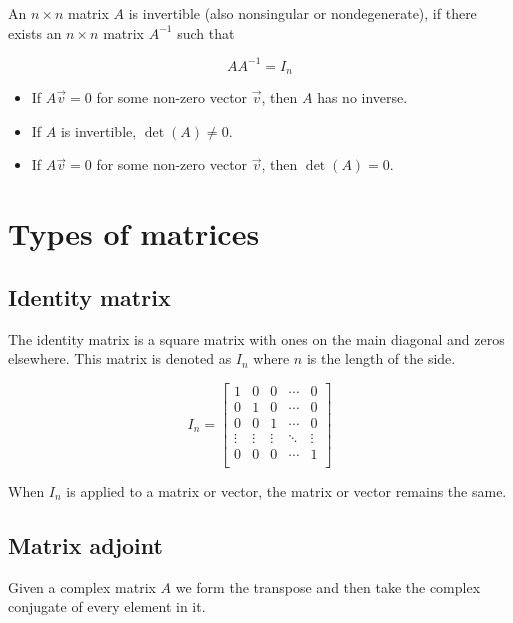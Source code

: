\documentclass{article}
\begin{document}
An \(n \times n\) matrix \(A\) is invertible (also nonsingular or nondegenerate),
if there exists an \(n \times n\) matrix \(A^{-1}\) such that

\[
    AA^{-1}=I_n
\]

\begin{itemize}
    \item If \(A\vec{v}=0\) for some non-zero vector \(\vec{v}\), then \(A\) has no inverse.
    \item If \(A\) is invertible, \(\det(A)\neq 0\).
    \item If \(A\vec{v}=0\) for some non-zero vector \(\vec{v}\), then \(\det(A)=0\).
\end{itemize}

\pagebreak

\section{Types of matrices}

\subsection{Identity matrix}

The identity matrix is a square matrix with ones on the main diagonal and zeros elsewhere.
This matrix is denoted as \(I_n\) where \(n\) is the length of the side.

\[
    I_n=
    \begin{bmatrix}
        1 & 0 & 0 & \cdots & 0 \\
        0 & 1 & 0 & \cdots & 0 \\
        0 & 0 & 1 & \cdots & 0 \\
        \vdots & \vdots & \vdots & \ddots & \vdots \\
        0 & 0 & 0 & \cdots & 1 \\
    \end{bmatrix}
\]

When \(I_n\) is applied to a matrix or vector, the matrix or vector remains the same.


\subsection{Matrix adjoint}

Given a complex matrix \(A\) we form the transpose and then take the complex conjugate of every element in it.
\end{document}
